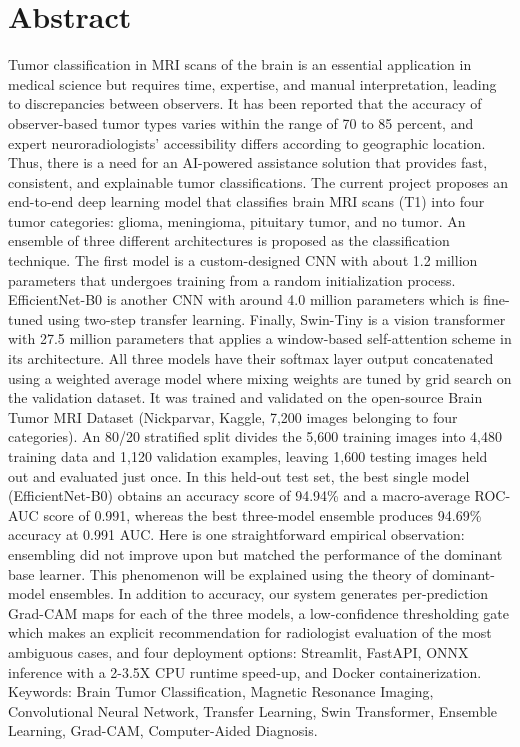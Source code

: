 \documentclass[12pt,a4paper,oneside]{report}
\begin{document}
\chapter*{Abstract}
Tumor classification in MRI scans of the brain is an essential application in medical science but requires time, expertise, and manual interpretation, leading to discrepancies between observers. It has been reported that the accuracy of observer-based tumor types varies within the range of 70 to 85 percent, and expert neuroradiologists' accessibility differs according to geographic location. Thus, there is a need for an AI-powered assistance solution that provides fast, consistent, and explainable tumor classifications.
The current project proposes an end-to-end deep learning model that classifies brain MRI scans (T1) into four tumor categories: glioma, meningioma, pituitary tumor, and no tumor. An ensemble of three different architectures is proposed as the classification technique. The first model is a custom-designed CNN with about 1.2 million parameters that undergoes training from a random initialization process. EfficientNet-B0 is another CNN with around 4.0 million parameters which is fine-tuned using two-step transfer learning. Finally, Swin-Tiny is a vision transformer with 27.5 million parameters that applies a window-based self-attention scheme in its architecture. All three models have their softmax layer output concatenated using a weighted average model where mixing weights are tuned by grid search on the validation dataset.
It was trained and validated on the open-source Brain Tumor MRI Dataset (Nickparvar, Kaggle, 7,200 images belonging to four categories). An 80/20 stratified split divides the 5,600 training images into 4,480 training data and 1,120 validation examples, leaving 1,600 testing images held out and evaluated just once. In this held-out test set, the best single model (EfficientNet-B0) obtains an accuracy score of 94.94\% and a macro-average ROC-AUC score of 0.991, whereas the best three-model ensemble produces 94.69\% accuracy at 0.991 AUC. Here is one straightforward empirical observation: ensembling did not improve upon but matched the performance of the dominant base learner. This phenomenon will be explained using the theory of dominant-model ensembles.
In addition to accuracy, our system generates per-prediction Grad-CAM maps for each of the three models, a low-confidence thresholding gate which makes an explicit recommendation for radiologist evaluation of the most ambiguous cases, and four deployment options: Streamlit, FastAPI, ONNX inference with a 2-3.5X CPU runtime speed-up, and Docker containerization.
Keywords: Brain Tumor Classification, Magnetic Resonance Imaging, Convolutional Neural Network, Transfer Learning, Swin Transformer, Ensemble Learning, Grad-CAM, Computer-Aided Diagnosis.
\tableofcontents
\listoffigures
\listoftables
\clearpage
{}
\end{document}
